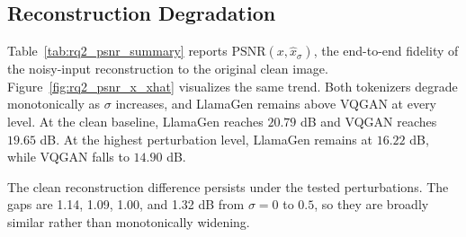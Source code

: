\subsection{Reconstruction Degradation}
\label{subsec:rq2_image_space}

Table~\ref{tab:rq2_psnr_summary} reports $\mathrm{PSNR}(x,\hat{x}_{\sigma})$, the end-to-end fidelity of the noisy-input reconstruction to the original clean image. Figure~\ref{fig:rq2_psnr_x_xhat} visualizes the same trend. Both tokenizers degrade monotonically as $\sigma$ increases, and LlamaGen remains above VQGAN at every level. At the clean baseline, LlamaGen reaches $20.79$ dB and VQGAN reaches $19.65$ dB. At the highest perturbation level, LlamaGen remains at $16.22$ dB, while VQGAN falls to $14.90$ dB.

The clean reconstruction difference persists under the tested perturbations.
The gaps are 1.14, 1.09, 1.00, and 1.32 dB from $\sigma=0$ to $0.5$, so they are
broadly similar rather than monotonically widening.


